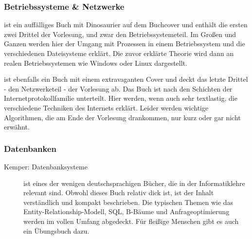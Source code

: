 \subsubsection{Betriebssysteme \& Netzwerke}
\begin{description}[style=unboxed]
\item[Silberschatz: Operating Systems Concepts]{
	ist ein auffälliges Buch mit Dinosaurier auf dem Buchcover und enthält die ersten zwei Drittel der Vorlesung, und zwar den Betriebssystemeteil. Im Großen und Ganzen werden hier der Umgang mit Prozessen in einem Betriebssystem und die verschiedenen Dateisysteme erklärt. Die zuvor erklärte Theorie wird dann an realen Betriebssystemen wie Windows oder Linux dargestellt.}

\item[Tanenbaum: Computer Networks]{
	ist ebenfalls ein Buch mit einem extravaganten Cover und deckt das letzte Drittel - den Netzwerketeil - der Vorlesung ab. Das Buch ist nach den Schichten der Internetprotokollfamilie unterteilt. Hier werden, wenn auch sehr textlastig, die verschiedene Techniken des Internets erklärt. Leider werden wichtige Algorithmen, die am Ende der Vorlesung drankommen, nur kurz oder gar nicht erwähnt.}
\end{description}

\subsubsection{Datenbanken}
\begin{description}
\item[Kemper: Datenbanksysteme]{
	ist eines der wenigen deutschsprachigen Bücher, die in der Informatiklehre relevant sind. Obwohl dieses Buch relativ dick ist, ist der Inhalt verständlich und kompakt beschrieben. Die typischen Themen wie das Entity-Relationship-Modell, SQL, B-Bäume und Anfrageoptimierung werden im vollen Umfang abgedeckt. Für fleißige Menschen gibt es auch ein Übungsbuch dazu.}
\end{description}

